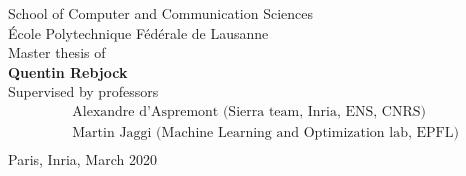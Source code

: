 \begin{titlepage}
\begin{center}
School of Computer and Communication Sciences\\
École Polytechnique Fédérale de Lausanne\\
\vspace{1cm}
Master thesis of\\[3pt]
\textbf{Quentin Rebjock}\\
\vspace{1.2cm}
\small
Supervised by professors%
\begin{align*}
	&\text{Alexandre d'Aspremont (Sierra team, Inria, ENS, CNRS)}\\
	&\text{Martin Jaggi (Machine Learning and Optimization lab, EPFL)}\\[24pt]
\end{align*}
Paris, Inria, March 2020

\end{center}
\end{titlepage}

\restoregeometry
